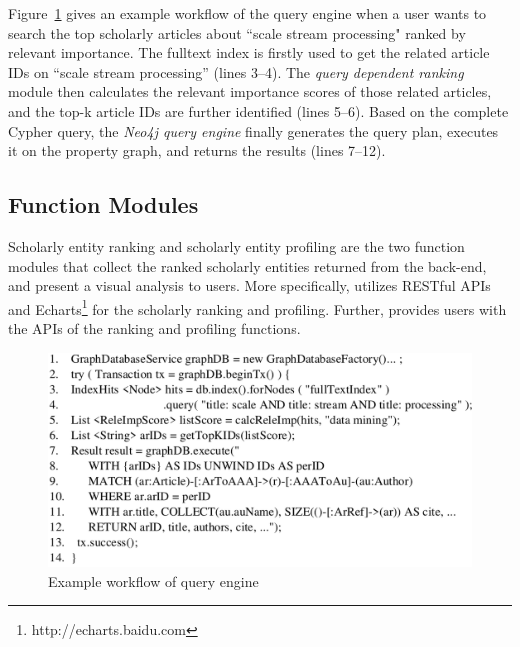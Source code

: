 

%


Figure~\ref{fig:queryProcess} gives an example workflow of the query engine when a user wants to search the top scholarly articles about ``scale stream processing"  ranked by relevant importance. The fulltext index is firstly used to get the related article IDs on ``scale stream processing'' (lines 3--4). The {\em query dependent ranking} module then calculates the relevant importance scores of those related articles, and the top-k article IDs are further identified (lines 5--6). Based on the complete Cypher query, the {\em Neo4j query engine} finally generates the query plan, executes it on the property graph, and returns the results (lines 7--12).







\subsection{Function Modules}
Scholarly entity ranking and scholarly entity profiling are the two function modules that collect the ranked scholarly entities returned from the back-end, and present a visual analysis to users. More specifically, \oursystem utilizes RESTful APIs  and Echarts\footnote{ http://echarts.baidu.com} for the scholarly ranking and profiling. Further, \oursystem provides users with the APIs of the ranking and profiling functions.

\begin{figure}
\centering
\includegraphics[width=\columnwidth]{queryProcess.pdf}
\vspace{-3ex}
\caption{Example workflow of \oursystem query engine}
\label{fig:queryProcess}
\vspace{-2ex}
\end{figure}




